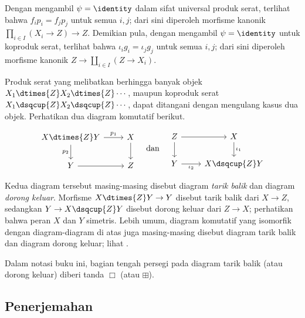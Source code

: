 Dengan mengambil $\psi = \identity$ dalam sifat universal produk serat,
terlihat bahwa $f_i p_i = f_j p_j$ untuk semua $i,j$; dari sini diperoleh
morfisme kanonik $\prod_{i \in I} (X_i \to Z) \to Z$. Demikian pula, dengan
mengambil $\psi = \identity$ untuk koproduk serat, terlihat bahwa
$\iota_i g_i = \iota_j g_j$ untuk semua $i,j$; dari sini diperoleh morfisme
kanonik $Z \to \coprod_{i \in I} (Z \to X_i)$.

Produk serat yang melibatkan berhingga banyak objek
$X_1 \dtimes{Z} X_2 \dtimes{Z} \cdots$, maupun koproduk serat
$X_1 \dsqcup{Z} X_2 \dsqcup{Z} \cdots$, dapat ditangani dengan mengulang kasus dua objek.
Perhatikan dua diagram komutatif berikut.

\[\begin{tikzcd}
	X \dtimes{Z} Y \arrow[r, "p_1"] \arrow[d, "p_2"'] & X \arrow[d] \\
	Y \arrow[r] & Z
\end{tikzcd} \quad \text{dan} \quad \begin{tikzcd}
	Z \arrow[r] \arrow[d] & X \arrow[d, "\iota_1"] \\
	Y \arrow[r, "\iota_2"'] & X \dsqcup{Z} Y
\end{tikzcd}\]

Kedua diagram tersebut masing-masing disebut diagram \emph{tarik balik} dan
diagram \emph{dorong keluar}. Morfisme $X \dtimes{Z} Y \to Y$ disebut tarik balik dari
$X \to Z$, sedangkan $Y \to X \dsqcup{Z} Y$ disebut dorong keluar dari
$Z \to X$; perhatikan bahwa peran $X$ dan $Y$ simetris. Lebih umum, diagram
komutatif yang isomorfik dengan diagram-diagram di atas juga masing-masing
disebut diagram tarik balik dan diagram dorong keluar; lihat
\cite[Definisi~2.8.5]{Li1}.

Dalam notasi buku ini, bagian tengah persegi pada diagram tarik balik (atau dorong
keluar) diberi tanda $\Box$ (atau $\boxplus$).

\subsection*{Penerjemahan}

